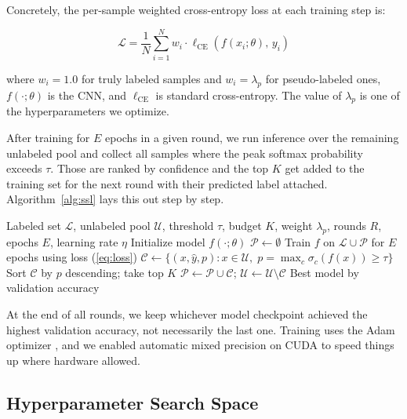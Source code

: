 \documentclass[journal]{IEEEtran}
\begin{document}
Concretely, the per-sample weighted cross-entropy loss at each training step
is:

\begin{equation}
\mathcal{L} = \frac{1}{N} \sum_{i=1}^{N} w_i \cdot
\ell_{\mathrm{CE}}(f(x_i; \theta),\, y_i)
\label{eq:loss}
\end{equation}

where $w_i = 1.0$ for truly labeled samples and $w_i = \lambda_p$ for
pseudo-labeled ones, $f(\cdot;\theta)$ is the CNN, and $\ell_{\mathrm{CE}}$
is standard cross-entropy. The value of $\lambda_p$ is one of the
hyperparameters we optimize.

After training for $E$ epochs in a given round, we run inference over the
remaining unlabeled pool and collect all samples where the peak softmax
probability exceeds $\tau$. Those are ranked by confidence and the top $K$
get added to the training set for the next round with their predicted label
attached. Algorithm~\ref{alg:ssl} lays this out step by step.

\begin{algorithm}
\caption{Weighted Pseudo-Labeling SSL}
\label{alg:ssl}
\begin{algorithmic}[1]
\REQUIRE Labeled set $\mathcal{L}$, unlabeled pool $\mathcal{U}$,
         threshold $\tau$, budget $K$, weight $\lambda_p$, rounds $R$,
         epochs $E$, learning rate $\eta$
\STATE Initialize model $f(\cdot;\theta)$
\STATE $\mathcal{P} \leftarrow \emptyset$ 
    \STATE Train $f$ on $\mathcal{L} \cup \mathcal{P}$ for $E$ epochs using
           loss (\ref{eq:loss})
    \STATE $\mathcal{C} \leftarrow \{(x, \hat{y}, p) : x \in \mathcal{U},\;
           p = \max_c \sigma_c(f(x)) \geq \tau\}$
    \STATE Sort $\mathcal{C}$ by $p$ descending; take top $K$
    \STATE $\mathcal{P} \leftarrow \mathcal{P} \cup \mathcal{C}$;
           $\mathcal{U} \leftarrow \mathcal{U} \setminus \mathcal{C}$
\ENDFOR
\RETURN Best model by validation accuracy
\end{algorithmic}
\end{algorithm}

At the end of all rounds, we keep whichever model checkpoint achieved the
highest validation accuracy, not necessarily the last one. Training uses the
Adam optimizer \cite{kingma2014adam}, and we enabled automatic mixed precision
on CUDA to speed things up where hardware allowed.

\subsection{Hyperparameter Search Space}
\end{document}
